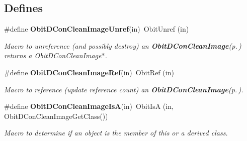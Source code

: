 \subsection*{Defines}
\begin{CompactItemize}
\item 
\#define {\bf Obit\-DCon\-Clean\-Image\-Unref}(in)\ Obit\-Unref (in)
\begin{CompactList}\small\item\em Macro to unreference (and possibly destroy) an {\bf Obit\-DCon\-Clean\-Image}{\rm (p.\,\pageref{structObitDConCleanImage})} returns a Obit\-DCon\-Clean\-Image$\ast$. \item\end{CompactList}\item 
\#define {\bf Obit\-DCon\-Clean\-Image\-Ref}(in)\ Obit\-Ref (in)
\begin{CompactList}\small\item\em Macro to reference (update reference count) an {\bf Obit\-DCon\-Clean\-Image}{\rm (p.\,\pageref{structObitDConCleanImage})}. \item\end{CompactList}\item 
\#define {\bf Obit\-DCon\-Clean\-Image\-Is\-A}(in)\ Obit\-Is\-A (in, Obit\-DCon\-Clean\-Image\-Get\-Class())
\begin{CompactList}\small\item\em Macro to determine if an object is the member of this or a derived class. \item\end{CompactList}\end{CompactItemize}
